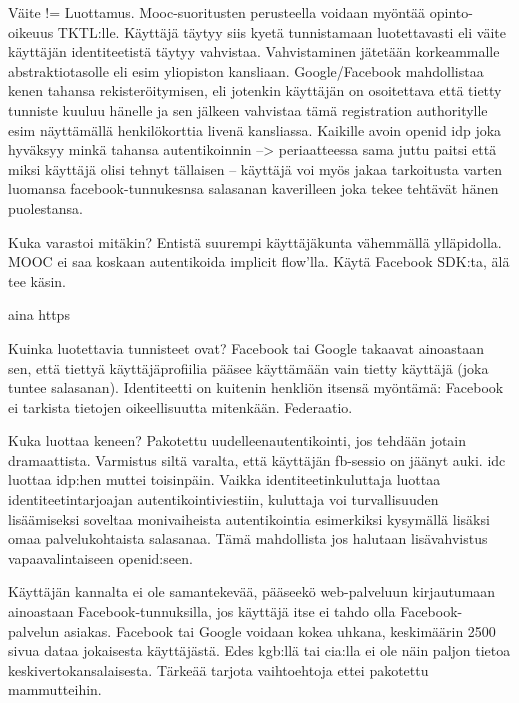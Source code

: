 \documentclass[finnish,gradu]{tktltiki}
\begin{document}
  Väite != Luottamus. Mooc-suoritusten perusteella voidaan myöntää opinto-oikeuus TKTL:lle. Käyttäjä täytyy siis kyetä tunnistamaan luotettavasti eli väite käyttäjän identiteetistä täytyy vahvistaa. Vahvistaminen jätetään korkeammalle abstraktiotasolle eli esim yliopiston kansliaan. Google/Facebook mahdollistaa kenen tahansa rekisteröitymisen, eli jotenkin käyttäjän on osoitettava että tietty tunniste kuuluu hänelle ja sen jälkeen vahvistaa tämä registration authoritylle esim näyttämällä henkilökorttia livenä kansliassa. Kaikille avoin openid idp joka hyväksyy minkä tahansa autentikoinnin --> periaatteessa sama juttu paitsi että miksi käyttäjä olisi tehnyt tällaisen -- käyttäjä voi myös jakaa tarkoitusta varten luomansa facebook-tunnukesnsa salasanan kaverilleen joka tekee tehtävät hänen puolestansa.

  Kuka varastoi mitäkin?
  Entistä suurempi käyttäjäkunta vähemmällä ylläpidolla.
  MOOC ei saa koskaan autentikoida implicit flow'lla.
  Käytä Facebook SDK:ta, älä tee käsin.

    aina https

  Kuinka luotettavia tunnisteet ovat?
  Facebook tai Google takaavat ainoastaan sen, että tiettyä käyttäjäprofiilia pääsee käyttämään vain tietty käyttäjä (joka tuntee salasanan). Identiteetti on kuitenin henkliön itsensä myöntämä: Facebook ei tarkista tietojen oikeellisuutta mitenkään. Federaatio.

  Kuka luottaa keneen?
  Pakotettu uudelleenautentikointi, jos tehdään jotain dramaattista. Varmistus siltä varalta, että käyttäjän fb-sessio on jäänyt auki.
  idc luottaa idp:hen muttei toisinpäin.
  Vaikka identiteetinkuluttaja luottaa identiteetintarjoajan autentikointiviestiin, kuluttaja voi turvallisuuden lisäämiseksi soveltaa monivaiheista autentikointia esimerkiksi kysymällä lisäksi omaa palvelukohtaista salasanaa. Tämä mahdollista jos halutaan lisävahvistus vapaavalintaiseen openid:seen.


  Käyttäjän kannalta ei ole samantekevää, pääseekö web-palveluun kirjautumaan ainoastaan Facebook-tunnuksilla, jos käyttäjä itse ei tahdo olla Facebook-palvelun asiakas. Facebook tai Google voidaan kokea uhkana, keskimäärin 2500 sivua dataa jokaisesta käyttäjästä. Edes kgb:llä tai cia:lla ei ole näin paljon tietoa keskivertokansalaisesta. Tärkeää tarjota vaihtoehtoja ettei pakotettu mammutteihin.
\end{document}
